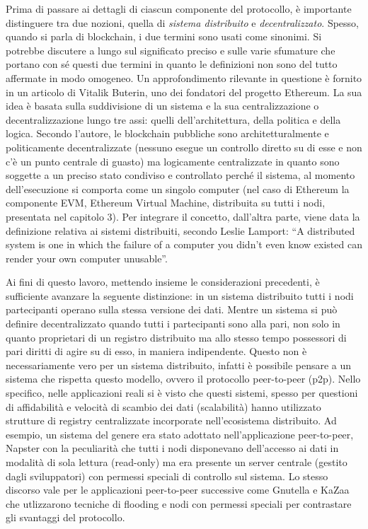 Prima di passare ai dettagli di ciascun componente del protocollo, è importante distinguere tra due nozioni, quella di \emph{sistema distribuito} e \emph{decentralizzato}. Spesso, quando si parla di blockchain, i due termini sono usati come sinonimi. Si potrebbe discutere a lungo sul significato preciso e sulle varie sfumature che portano con sé questi due termini in quanto le definizioni non sono del tutto affermate in modo omogeneo. Un approfondimento rilevante in questione è fornito in un articolo di Vitalik Buterin, uno dei fondatori del progetto Ethereum. La sua idea è basata sulla suddivisione di un sistema e la sua centralizzazione o decentralizzazione lungo tre assi: quelli dell’architettura, della politica e della logica.
Secondo l’autore, le blockchain pubbliche sono architetturalmente e politicamente decentralizzate (nessuno esegue un controllo diretto su di esse e non c’è un punto centrale di guasto) ma logicamente centralizzate in quanto sono soggette a un preciso stato condiviso e controllato perché il sistema, al momento dell'esecuzione si comporta come un singolo computer (nel caso di Ethereum la componente EVM, Ethereum Virtual Machine, distribuita su tutti i nodi, presentata nel capitolo 3). Per integrare il concetto, dall’altra parte, viene data la definizione relativa ai sistemi distribuiti, secondo Leslie Lamport: “A distributed system is one in which the failure of a computer you didn't even know existed can render your own computer unusable”. %

Ai fini di questo lavoro, mettendo insieme le considerazioni precedenti, è sufficiente avanzare la seguente distinzione: in un sistema distribuito tutti i nodi partecipanti operano sulla stessa versione dei dati. Mentre un sistema si può definire decentralizzato quando tutti i partecipanti sono alla pari, non solo in quanto proprietari di un registro distribuito ma allo stesso tempo possessori di pari diritti di agire su di esso, in maniera indipendente. Questo non è necessariamente vero per un sistema distribuito, infatti è possibile pensare a un sistema che rispetta questo modello, ovvero il protocollo peer-to-peer (p2p). Nello specifico, nelle applicazioni reali si è visto che questi sistemi, spesso per questioni di affidabilità e velocità di scambio dei dati (scalabilità) hanno utilizzato strutture di registry centralizzate incorporate nell’ecosistema distribuito. Ad esempio, un sistema del genere era stato adottato nell’applicazione peer-to-peer, Napster con la peculiarità che tutti i nodi disponevano dell’accesso ai dati in modalità di sola lettura (read-only) ma era presente un server centrale (gestito dagli sviluppatori) con permessi speciali di controllo sul sistema. Lo stesso discorso vale per le applicazioni peer-to-peer successive come Gnutella e KaZaa che utlizzarono tecniche di flooding e nodi con permessi speciali per contrastare gli svantaggi del protocollo. %

